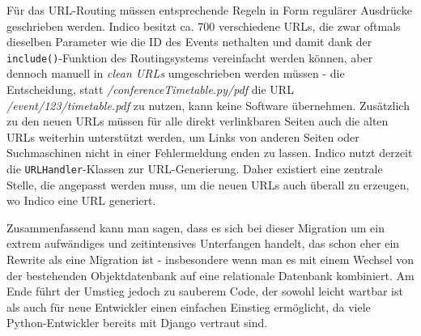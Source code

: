 Für das URL-Routing müssen entsprechende Regeln in Form regulärer Ausdrücke geschrieben werden.
Indico besitzt ca. 700 verschiedene URLs, die zwar oftmals dieselben Parameter wie die ID des Events
nethalten und damit dank der \lstinline{include()}-Funktion des Routingsystems vereinfacht werden
können, aber dennoch manuell in \emph{clean URLs} umgeschrieben werden müssen - die Entscheidung,
statt \emph{/conferenceTimetable.py/pdf} die URL \emph{/event/123/timetable.pdf} zu
nutzen, kann keine Software übernehmen. Zusätzlich zu den neuen URLs müssen für alle direkt
verlinkbaren Seiten auch die alten URLs weiterhin unterstützt werden, um Links von
anderen Seiten oder Suchmaschinen nicht in einer Fehlermeldung enden zu lassen. Indico nutzt derzeit
die \lstinline{URLHandler}-Klassen zur URL-Generierung. Daher existiert eine zentrale Stelle, die
angepasst werden muss, um die neuen URLs auch überall zu erzeugen, wo Indico eine URL generiert.

Zusammenfassend kann man sagen, dass es sich bei dieser Migration um ein extrem aufwändiges und
zeitintensives Unterfangen handelt, das schon eher ein Rewrite als eine Migration ist - insbesondere
wenn man es mit einem Wechsel von der bestehenden Objektdatenbank auf eine relationale Datenbank
kombiniert. Am Ende führt der Umstieg jedoch zu sauberem Code, der sowohl leicht wartbar ist als
auch für neue Entwickler einen einfachen Einstieg ermöglicht, da viele Python-Entwickler bereits mit
Django vertraut sind.


